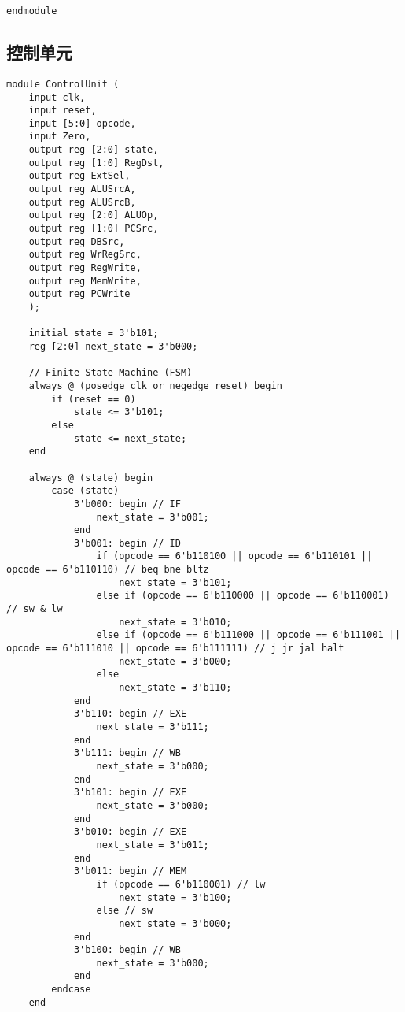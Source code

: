 \begin{multicols}{2}
\begin{lstlisting}
endmodule
\end{lstlisting}

\subsection{控制单元}
\begin{lstlisting}
module ControlUnit (
    input clk,
    input reset,
    input [5:0] opcode,
    input Zero,
    output reg [2:0] state,
    output reg [1:0] RegDst,
    output reg ExtSel,
    output reg ALUSrcA,
    output reg ALUSrcB,
    output reg [2:0] ALUOp,
    output reg [1:0] PCSrc,
    output reg DBSrc,
    output reg WrRegSrc,
    output reg RegWrite,
    output reg MemWrite,
    output reg PCWrite
    );

    initial state = 3'b101;
    reg [2:0] next_state = 3'b000;

    // Finite State Machine (FSM)
    always @ (posedge clk or negedge reset) begin
        if (reset == 0)
            state <= 3'b101;
        else
            state <= next_state;
    end

    always @ (state) begin
        case (state)
            3'b000: begin // IF
                next_state = 3'b001;
            end
            3'b001: begin // ID
                if (opcode == 6'b110100 || opcode == 6'b110101 || opcode == 6'b110110) // beq bne bltz
                    next_state = 3'b101;
                else if (opcode == 6'b110000 || opcode == 6'b110001) // sw & lw
                    next_state = 3'b010;
                else if (opcode == 6'b111000 || opcode == 6'b111001 || opcode == 6'b111010 || opcode == 6'b111111) // j jr jal halt
                    next_state = 3'b000;
                else
                    next_state = 3'b110;
            end
            3'b110: begin // EXE
                next_state = 3'b111;
            end
            3'b111: begin // WB
                next_state = 3'b000;
            end
            3'b101: begin // EXE
                next_state = 3'b000;
            end
            3'b010: begin // EXE
                next_state = 3'b011;
            end
            3'b011: begin // MEM
                if (opcode == 6'b110001) // lw
                    next_state = 3'b100;
                else // sw
                    next_state = 3'b000;
            end
            3'b100: begin // WB
                next_state = 3'b000;
            end
        endcase
    end


\end{lstlisting}
\end{multicols}
